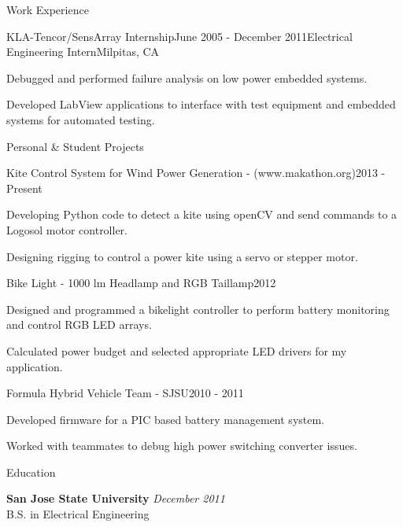 \documentclass{resume} %
\begin{document}
\begin{rSection}{Work Experience}
\pagebreak[2]
\ssquish
\begin{rSubsection}{KLA-Tencor/SensArray Internship}{June 2005 - December 2011}{Electrical Engineering Intern}{Milpitas, CA}
\item Debugged and performed failure analysis on low power embedded systems. 
\item Developed LabView applications to interface with test equipment and embedded systems for automated testing.
\end{rSubsection}
\end{rSection}

\pagebreak[3]
\begin{rSection}{Personal \& Student Projects}

\ssquish
\begin{rProject}{Kite Control System for Wind Power Generation - (www.makathon.org)}{2013 - Present}
\item Developing Python code to detect a kite using openCV and send commands to a Logosol motor controller.
\item Designing rigging to control a power kite using a servo or stepper motor.
\end{rProject}

\ssquish
\begin{rProject}{Bike Light - 1000 lm Headlamp and RGB Taillamp}{2012}
\item Designed and programmed a bikelight controller to perform battery monitoring and control RGB LED arrays.
\item Calculated power budget and selected appropriate LED drivers for my application.
\end{rProject}

\ssquish
\begin{rProject}{Formula Hybrid Vehicle Team - SJSU}{2010 - 2011}
\item Developed firmware for a PIC based battery management system.
\item Worked with teammates to debug high power switching converter issues.
\end{rProject}
\end{rSection}


\pagebreak[3]
\begin{rSection}{Education}

{\bf San Jose State University} \hfill {\em December 2011} \\ 
B.S. in Electrical Engineering \\

\end{rSection}
\end{document}
